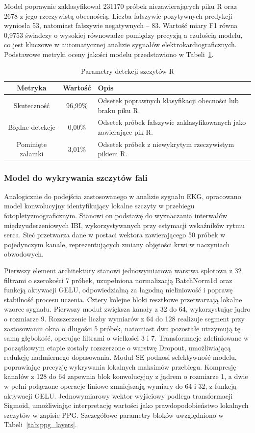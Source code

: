 \documentclass[journal]{IEEEtran}
\begin{document}
Model poprawnie zaklasyfikował 231170 próbek niezawierających piku R oraz 2678 z jego rzeczywistą obecnością. Liczba fałszywie pozytywnych predykcji wyniosła 53, natomiast fałszywie negatywnych -- 83. Wartość miary F1 równa 0,9753 świadczy o wysokiej równowadze pomiędzy precyzją a czułością modelu, co jest kluczowe w automatycznej analizie sygnałów elektrokardiograficznych. Podstawowe metryki oceny jakości modelu przedstawiono w Tabeli~\ref{tab:metrics}.

\begin{table}[ht]
\centering
\caption{Parametry detekcji szczytów R}
\label{tab:metrics}
\begin{tabular}{|c|c|p{4.6cm}|}
\hline
\textbf{Metryka} & \textbf{Wartość} & \textbf{Opis} \\
\hline
Skuteczność & 96,99\% & Odsetek poprawnych klasyfikacji obecności lub braku piku R. \\
Błędne detekcje & 0,00\% & Odsetek próbek fałszywie zaklasyfikowanych jako zawierające pik R. \\
Pominięte załamki & 3,01\% & Odsetek próbek z niewykrytym rzeczywistym pikiem R. \\
\hline
\end{tabular}
\end{table}

\newpage
\subsubsection{Model do wykrywania szczytów fali}
Analogicznie do podejścia zastosowanego w analizie sygnału EKG, opracowano model konwolucyjny identyfikujący lokalne szczyty w przebiegu fotopletyzmograficznym. Stanowi on podstawę do wyznaczania interwałów międzyuderzeniowych IBI, wykorzystywanych przy estymacji wskaźników rytmu serca. Sieć przetwarza dane w postaci wektora zawierającego 50 próbek w pojedynczym kanale, reprezentujących zmiany objętości krwi w naczyniach obwodowych.

Pierwszy element architektury stanowi jednowymiarowa warstwa splotowa z 32 filtrami o szerokości 7 próbek, uzupełniona normalizacją BatchNorm1d oraz funkcją aktywacji GELU, odpowiedzialną za łagodną nieliniowość i poprawę stabilność procesu uczenia. Cztery kolejne bloki resztkowe przetwarzają lokalne wzorce sygnału. Pierwszy moduł zwiększa kanały z 32 do 64, wykorzystując jądro o rozmiarze 9.  Rozszerzenie liczby wymiarów z 64 do 128 realizuje segment przy zastosowaniu okna o długości 5 próbek, natomiast dwa pozostałe utrzymują tę samą głębokość, operując filtrami o wielkości 3 i 7. Transformacje zdefiniowane w początkowym etapie zostały rozszerzone o warstwę Dropout, umożliwiającą redukcję nadmiernego dopasowania. Moduł SE podnosi selektywność modelu, poprawiając precyzję wykrywania lokalnych maksimów przebiegu. Kompresję kanałów z 128 do 64 zapewnia blok konwolucyjny z jądrem o rozmiarze 1, a dwie w pełni połączone operacje liniowe zmniejszają wymiary do 64 i 32, z funkcją aktywacji GELU. Jednowymiarowy wektor wyjściowy podlega transformacji Sigmoid, umożliwiając interpretację wartości jako prawdopodobieństwo lokalnych szczytów w zapisie PPG. Szczegółowe parametry bloków uwzględniono w Tabeli~\ref{tab:ppg_layers}.
\end{document}

